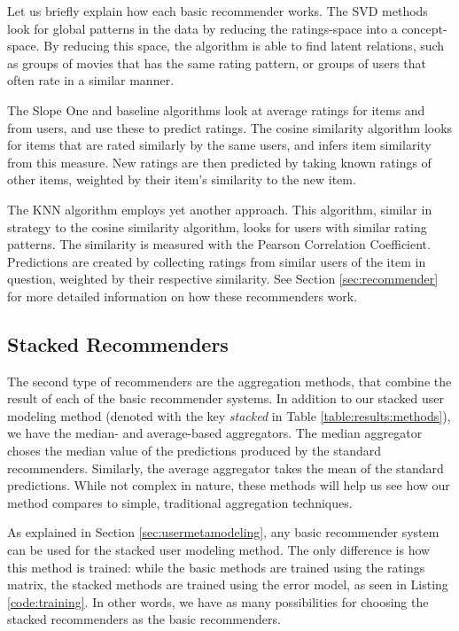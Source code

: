 Let us briefly explain how each basic recommender works.
The SVD methods look for global patterns in the data 
by reducing the ratings-space into a concept-space.
By reducing this space, the algorithm is able to find
latent relations, such as groups of movies that has the same
rating pattern, or groups of users that often rate in a similar manner.

The Slope One and baseline algorithms look at average
ratings for items and from users, and use these to predict ratings.
The cosine similarity algorithm looks for items that are rated
similarly by the same users, and infers item similarity from this measure.
New ratings are then predicted by taking known ratings of other items,
weighted by their item's similarity to the new item.

The KNN algorithm employs yet another approach. This algorithm,
similar in strategy to the cosine similarity algorithm,
looks for users with similar rating patterns.
The similarity is measured with the Pearson Correlation Coefficient.
Predictions are created by collecting ratings from similar users
of the item in question, weighted by their respective similarity.
See Section \ref{sec:recommender} for more 
detailed information on how these recommenders work. 

\subsection{Stacked Recommenders}

The second type of recommenders are the aggregation methods, 
that combine the result of each of the basic recommender systems.
In addition to our stacked user modeling method
(denoted with the key \emph{stacked} in Table \ref{table:results:methods}),
we have the median- and average-based aggregators.
The median aggregator choses the median value of the predictions
produced by the standard recommenders.
Similarly, the average aggregator takes the mean of the
standard predictions.
While not complex in nature, these methods
will help us see how our method compares to simple, traditional
aggregation techniques.

As explained in Section \ref{sec:usermetamodeling},
any basic recommender system can be used for the stacked user modeling method.
The only difference is how this method is trained:
while the basic methods are trained using the ratings matrix,
the stacked methods are trained using the error model,
as seen in Listing \ref{code:training}.
In other words, we have as many possibilities for choosing
the stacked recommenders as the basic recommenders.

